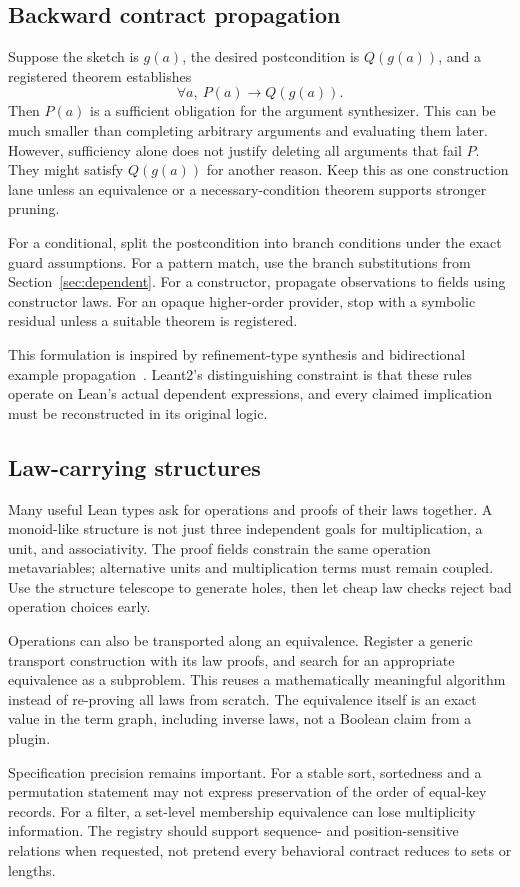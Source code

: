 \subsection{Backward contract propagation}

Suppose the sketch is $g(a)$, the desired postcondition is $Q(g(a))$, and a
registered theorem establishes
\[
 \forall a,\ P(a)\to Q(g(a)).
\]
Then $P(a)$ is a sufficient obligation for the argument synthesizer. This can
be much smaller than completing arbitrary arguments and evaluating them later.
However, sufficiency alone does not justify deleting all arguments that fail
$P$. They might satisfy $Q(g(a))$ for another reason. Keep this as one
construction lane unless an equivalence or a necessary-condition theorem
supports stronger pruning.

For a conditional, split the postcondition into branch conditions under the
exact guard assumptions. For a pattern match, use the branch substitutions
from Section~\ref{sec:dependent}. For a constructor, propagate observations to
fields using constructor laws. For an opaque higher-order provider, stop with
a symbolic residual unless a suitable theorem is registered.

This formulation is inspired by refinement-type synthesis and bidirectional
example propagation~\cite{synquid,smyth}. Leant2's distinguishing constraint is
that these rules operate on Lean's actual dependent expressions, and every
claimed implication must be reconstructed in its original logic.

\subsection{Law-carrying structures}

Many useful Lean types ask for operations and proofs of their laws together.
A monoid-like structure is not just three independent goals for multiplication,
a unit, and associativity. The proof fields constrain the same operation
metavariables; alternative units and multiplication terms must remain coupled.
Use the structure telescope to generate holes, then let cheap law checks reject
bad operation choices early.

Operations can also be transported along an equivalence. Register a generic
transport construction with its law proofs, and search for an appropriate
equivalence as a subproblem. This reuses a mathematically meaningful algorithm
instead of re-proving all laws from scratch. The equivalence itself is an exact
value in the term graph, including inverse laws, not a Boolean claim from a
plugin.

Specification precision remains important. For a stable sort, sortedness and a
permutation statement may not express preservation of the order of equal-key
records. For a filter, a set-level membership equivalence can lose multiplicity
information. The registry should support sequence- and position-sensitive
relations when requested, not pretend every behavioral contract reduces to
sets or lengths.
